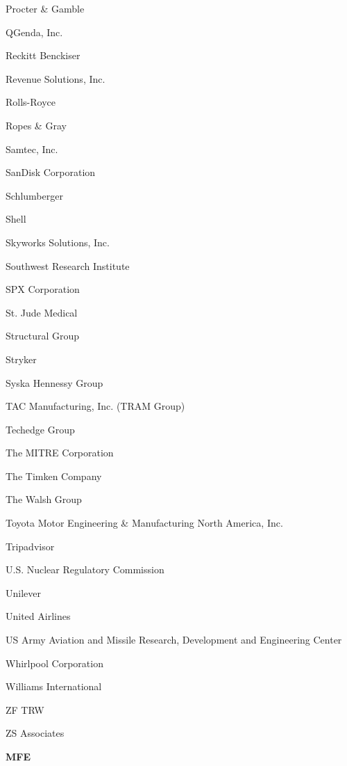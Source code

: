 \documentclass[twoside]{article}
\begin{document}
\begin{center}
\begin{multicols}{5}
\begin{FlushLeft}
\begin{compactitem}
\item Procter \& Gamble
\item QGenda, Inc.
\item Reckitt Benckiser
\item Revenue Solutions, Inc.
\item Rolls-Royce
\item Ropes \& Gray
\item Samtec, Inc.
\item SanDisk Corporation
\item Schlumberger
\item Shell
\item Skyworks Solutions, Inc.
\item Southwest Research Institute
\item SPX Corporation
\item St. Jude Medical
\item Structural Group
\item Stryker
\item Syska Hennessy Group
\item TAC Manufacturing, Inc. (TRAM Group)
\item Techedge Group
\item The MITRE Corporation
\item The Timken Company
\item The Walsh Group
\item Toyota Motor Engineering \& Manufacturing North America, Inc.
\item Tripadvisor
\item U.S. Nuclear Regulatory Commission
\item Unilever
\item United Airlines
\item US Army Aviation and Missile Research, Development and Engineering Center
\item Whirlpool Corporation
\item Williams International
\item ZF TRW
\item ZS Associates
\end{compactitem}
        \end{FlushLeft}
        \vspace{1em}
        {\fontsize{14}{16}\selectfont \bf MFE}\\
        \vspace{-1em}
        ~\hrulefill~
        \vspace{-.9em}
        \begin{FlushLeft}

\end{FlushLeft}
\end{multicols}
\end{center}
\end{document}
